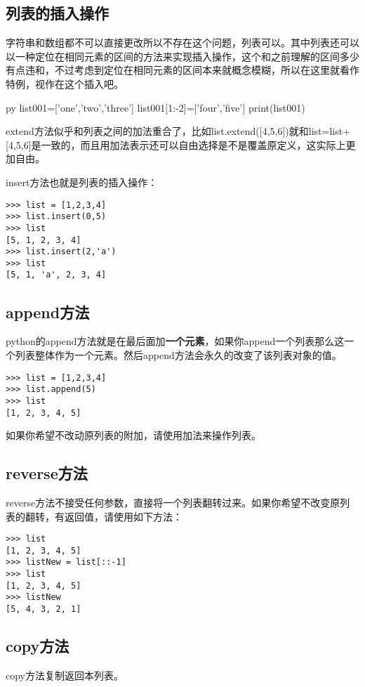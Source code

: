 \documentclass[12pt,oneside]{book}
\begin{document}
\begin{common-format}
\subsection{列表的插入操作}
\label{sec:列表插入操作}
字符串和数组都不可以直接更改所以不存在这个问题，列表可以。其中列表还可以以一种定位在相同元素的区间的方法来实现插入操作，这个和之前理解的区间多少有点违和，不过考虑到定位在相同元素的区间本来就概念模糊，所以在这里就看作特例，视作在这个插入吧。
\begin{xverbatim}[129]{py}
list001=['one','two','three']
list001[1:-2]=['four','five']
print(list001)
\end{xverbatim}

extend方法似乎和列表之间的加法重合了，比如list.extend([4,5,6])就和list=list+[4,5,6]是一致的，而且用加法表示还可以自由选择是不是覆盖原定义，这实际上更加自由。

insert方法也就是列表的插入操作：
\begin{Verbatim}
>>> list = [1,2,3,4]
>>> list.insert(0,5)
>>> list
[5, 1, 2, 3, 4]
>>> list.insert(2,'a')
>>> list
[5, 1, 'a', 2, 3, 4]
\end{Verbatim}


\subsection{append方法}
python的append方法就是在最后面加\textbf{一个元素}，如果你append一个列表那么这一个列表整体作为一个元素。然后append方法会永久的改变了该列表对象的值。

\begin{Verbatim}
>>> list = [1,2,3,4]
>>> list.append(5)
>>> list
[1, 2, 3, 4, 5]
\end{Verbatim}

如果你希望不改动原列表的附加，请使用加法来操作列表。

\subsection{reverse方法}
reverse方法不接受任何参数，直接将一个列表翻转过来。如果你希望不改变原列表的翻转，有返回值，请使用如下方法：
\begin{Verbatim}
>>> list
[1, 2, 3, 4, 5]
>>> listNew = list[::-1]
>>> list
[1, 2, 3, 4, 5]
>>> listNew
[5, 4, 3, 2, 1]
\end{Verbatim}

\subsection{copy方法}
copy方法复制返回本列表。



\end{common-format}
\end{document}
